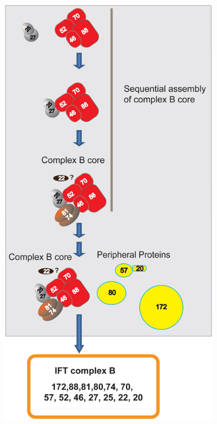 \begin{figure}[htbp]
\centering
\graphicspath{{figures/}}
\includegraphics[width=\textwidth-85mm]{fig2-15.jpg}

\end{figure}

